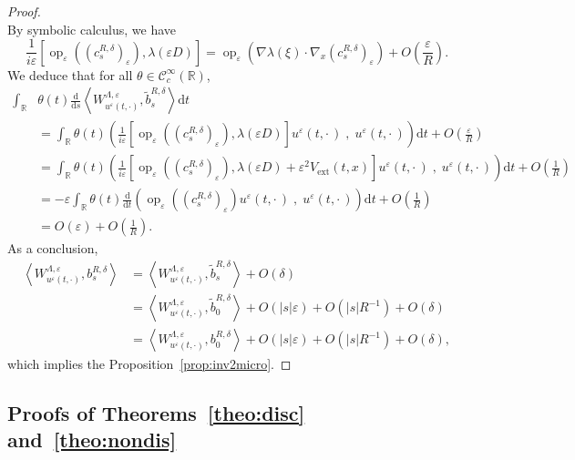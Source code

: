 \documentclass[AHL,Unicode,longabstracts]{cedram}
\DeclareMathOperator{\ext}{ext}
\DeclareMathOperator{\op}{op}
\newcommand*\R{{\mathbb R}}
\newcommand*\eps{\varepsilon}
\numberwithin{equation}{section}
\newcommand*{\dd}{\mathrm{d}}
\newcommand*{\dt}{\dd t}
\newcommand*{\ds}{\dd s}
\begin{document}
\begin{proof}
\[\]
By symbolic calculus, we have
\[
\frac{1}{i\eps} \left[\op_\eps((c^{R,\delta}_s)_\eps),\lambda(\eps D)\right] = \op_\eps\left(\nabla\lambda(\xi) \cdot \nabla_x (c^{R,\delta}_s)_\eps\right)+O\left(\frac{\eps}{R}\right).
\]
We deduce that for all $\theta\in{\mathcal C}_c^\infty(\R)$,
\begin{align*}
\int_\R &\theta(t) \frac{\dd}{\ds} \left\langle W_{u^\eps(t,\cdot)}^{\Lambda,\eps}, \widetilde b^{R,\delta}_s\right\rangle \dt \\
&= \int _\R\theta(t) \left(\frac{1}{i\eps} \left[\op_\eps((c^{R,\delta}_s)_\eps),\lambda(\eps D)\right] u^\eps(t,\cdot\,)\;,\;u^\eps(t,\cdot\,) \right) \dt +O\left(\frac{\eps}{R}\right)\\
&= \int _\R\theta(t) \left(\frac{1}{i\eps} \left[\op_\eps((c^{R,\delta}_s)_\eps),\lambda(\eps D)+\eps^2 V_{\ext}(t,x)\right] u^\eps(t,\cdot\,)\;,\;u^\eps(t,\cdot\,) \right) \dt +\!O\!\left(\frac{1}{R}\right)\\
&=-\eps \int _\R\theta(t) \frac{\dd}{\dt} \left(\op_\eps((c^{R,\delta}_s)_\eps) u^\eps(t,\cdot\,)\;,\;u^\eps(t,\cdot\,) \right) \dt +O\left(\frac{1}{R}\right)\\
&= O(\eps)+O\left(\frac{1}{R}\right).
\end{align*}
As a conclusion,
\begin{align*}
\left\langle W_{u^\eps(t,\cdot)}^{\Lambda,\eps}, b^{R,\delta}_s \right\rangle& = \left\langle W_{u^\eps(t,\cdot)}^{\Lambda,\eps}, \widetilde b^{R,\delta}_s\right\rangle +O(\delta)\\
& = \left\langle W_{u^\eps(t,\cdot)}^{\Lambda,\eps}, \widetilde b^{R,\delta}_0\right\rangle + O(|s|\eps)+O(|s| R^{-1}) + O(\delta)\\
& = \left\langle W_{u^\eps(t,\cdot)}^{\Lambda,\eps}, b^{R,\delta}_0\right\rangle + O(|s|\eps)+O(|s| R^{-1}) + O(\delta),
\end{align*}
which implies the Proposition~\ref{prop:inv2micro}.
\end{proof}



\subsection{Proofs of Theorems~\ref{theo:disc} and~\ref{theo:nondis}}
\end{document}
